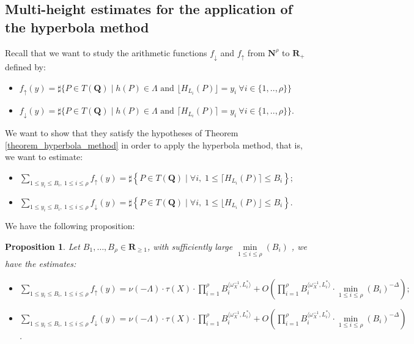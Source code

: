 \documentclass{proc-l}
\newcommand{\R}{\mathbf{R}}
\newcommand{\N}{\mathbf{N}}
\newcommand{\Q}{\mathbf{Q}}
\newcommand{\w}{\omega}
\newtheorem{prop}[theorem]{Proposition}
\theoremstyle{definition}
\theoremstyle{remark}
\numberwithin{equation}{section}
\begin{document}
\subsection{Multi-height estimates for the application of the hyperbola method}





Recall that we want to study the arithmetic functions $f_{\downarrow}$ and $f_{\uparrow}$ from $ \N^{\rho}$ to $ \R_+ $ defined by:
\begin{itemize}
    \item $f_{\uparrow}(y) = \sharp \{ P \in T(\Q) \mid h(P) \in \Lambda \text{ and } \lfloor H_{L_i}(P) \rfloor = y_i \ \forall i \in \{1,..,\rho\} \}$
    \item $f_{\downarrow}(y) = \sharp \{ P \in T(\Q) \mid h(P) \in \Lambda \text{ and } \lceil H_{L_i}(P) \rceil = y_i \ \forall i \in \{1,..,\rho\} \} .$ 
\end{itemize}We want to show that they satisfy the hypotheses of Theorem \ref{theorem_hyperbola_method} in order to apply the hyperbola method, that is, we want to estimate:
\begin{itemize}
    \item $\sum\limits_{1 \leqslant y_i \leqslant B_i,\ 1 \leqslant i \leqslant \rho} f_{\uparrow}(y) = \sharp \left\{ P \in T(\Q) \mid \forall i,\; 1 \leqslant \lceil H_{L_i}(P) \rceil \leqslant B_i \right\} ;$
    \item $\sum\limits_{1 \leqslant y_i \leqslant B_i,\ 1 \leqslant i \leqslant \rho} f_{\downarrow}(y) = \sharp \left\{ P \in T(\Q) \mid \forall i,\; 1 \leqslant \lfloor H_{L_i}(P) \rfloor \leqslant B_i \right\} .$
\end{itemize}


We have the following proposition:

\begin{prop}\label{proposition_first_hypothesis_arithmetic_function}
    Let $B_1, \dots, B_{\rho} \in \R_{\geqslant 1}$, with sufficiently large $\min\limits_{1 \leqslant i \leqslant {\rho}}(B_i)$ , we have the estimates:
\begin{itemize}
    \item $\sum\limits_{1 \leqslant y_i \leqslant B_i,\ 1 \leqslant i \leqslant \rho} f_{\uparrow}(y) 
= \nu(-\Lambda) \cdot \tau(X) \cdot \prod\limits_{i = 1}^{\rho} B_i^{\langle \w_X^{-1},L_i^* \rangle} 
+ O \!\left( \prod\limits_{i = 1}^{\rho} B_i^{\langle \w_X^{-1},L_i^* \rangle} \cdot
\min\limits_{1 \leqslant i \leqslant {\rho}}(B_i)^{-\Delta} \right) ;$ 
    \item $\sum\limits_{1 \leqslant y_i \leqslant B_i,\ 1 \leqslant i \leqslant \rho} f_{\downarrow}(y) 
= \nu(-\Lambda) \cdot \tau(X) \cdot \prod\limits_{i = 1}^{\rho} B_i^{\langle \w_X^{-1},L_i^* \rangle} 
+ O \!\left( \prod\limits_{i = 1}^{\rho} B_i^{\langle \w_X^{-1},L_i^* \rangle} \cdot
\min\limits_{1 \leqslant i \leqslant {\rho}}(B_i)^{-\Delta} \right) $.
\end{itemize}
\end{prop}
\end{document}
